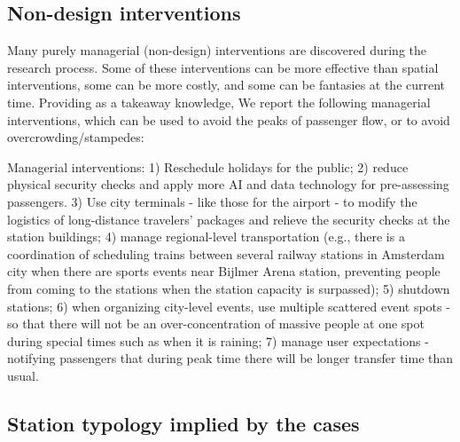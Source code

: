 \documentclass[]{article}
\begin{document}
\subsection{Non-design interventions}
\label{Non-design interventions}
Many purely managerial (non-design) interventions are discovered during the research process. Some of these interventions can be more effective than spatial interventions, some can be more costly, and some can be fantasies at the current time. Providing as a takeaway knowledge, We report the following managerial interventions, which can be used to avoid the peaks of passenger flow, or to avoid overcrowding/stampedes:

Managerial interventions: 1) Reschedule holidays for the public; 2) reduce physical security checks and apply more AI and data technology for pre-assessing passengers. 3) Use city terminals - like those for the airport - to modify the logistics of long-distance travelers' packages and relieve the security checks at the station buildings; 4) manage regional-level transportation (e.g., there is a coordination of scheduling trains between several railway stations in Amsterdam city when there are sports events near Bijlmer Arena station, preventing people from coming to the stations when the station capacity is surpassed); 5) shutdown stations; 6) when organizing city-level events, use multiple scattered event spots - so that there will not be an over-concentration of massive people at one spot during special times such as when it is raining; 7) manage user expectations - notifying passengers that during peak time there will be longer transfer time than usual.




\subsection{Station typology implied by the cases}
\label{Station typology implied by the cases}
\end{document}
